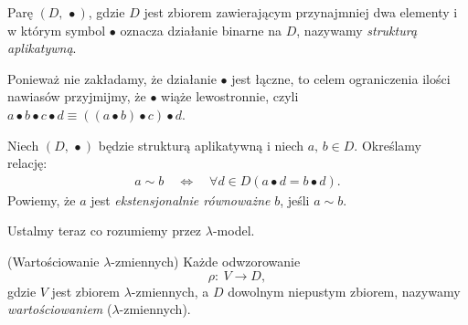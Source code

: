 \begin{definicja}
Parę \((D,\, \bullet)\), gdzie \(D\) jest zbiorem zawierającym przynajmniej dwa elementy i w którym symbol \(\bullet\) oznacza działanie binarne na \(D\), nazywamy \emph{strukturą aplikatywną}.
\end{definicja}
\begin{konwencja*}
  Ponieważ nie zakładamy, że działanie \(\bullet\) jest łączne, to celem ograniczenia ilości nawiasów przyjmijmy, że \(\bullet\) wiąże lewostronnie, czyli \(a\bullet b\bullet c\bullet d \equiv \left(\left(a\bullet b\right)\bullet c\right)\bullet d\).
\begin{definicja}%
Niech \((D,\,\bullet)\) będzie strukturą aplikatywną i niech \(a,\,b\in D\). Określamy relację: 
\begin{align*}
a \sim b \quad \Leftrightarrow\quad \forall d \in D \left(a \bullet d = b \bullet d\right).
\end{align*}
Powiemy, że \(a\) jest \emph{ekstensjonalnie równoważne} \(b\), jeśli \(a\sim b\).
\end{definicja}

\end{konwencja*}
Ustalmy teraz co rozumiemy przez \(\lambda\)-model.

\begin{definicja}(Wartościowanie \(\lambda\)-zmiennych) Każde odwzorowanie \[\rho:\:V\to D,\] gdzie \(V\) jest zbiorem \(\lambda\)-zmiennych, a \(D\) dowolnym niepustym zbiorem, nazywamy \emph{wartościowaniem} (\(\lambda\)-zmiennych).
\end{definicja}

